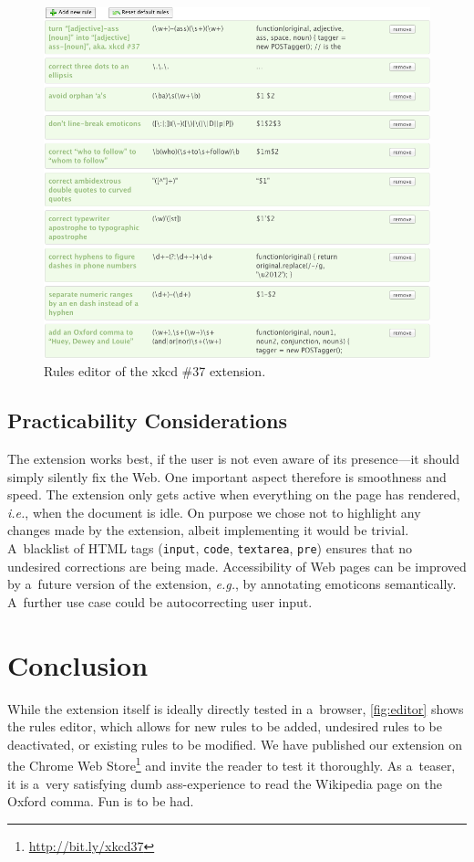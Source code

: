 \documentclass{sig-alternate}
\let\oldemph\emph
\renewcommand{\emph}[1]{\oldemph{\fontsize{9}{9}\selectfont #1}}
\newcommand{\inlinelistingsize}{\fontsize{8pt}{11pt}}
\let\oldurl\url
\renewcommand{\url}[1]{\inlinelistingsize\oldurl{#1}}
\begin{document}
\begin{figure}[h!]
\vspace{+10pt}
\begin{center}
   \includegraphics[width=1\linewidth]{./editor.png}
\end{center}
   \caption{Rules editor of the xkcd \#37 extension.}
\label{fig:editor}
\end{figure}

\subsection{Practicability Considerations}
The extension works best, if the user is not even aware of its
presence---it should simply silently fix the Web.
One important aspect therefore is smoothness and speed.
The extension only gets active when everything on the page has rendered, \emph{i.e.},
when the document is idle.
On purpose we chose not to highlight any changes made by the extension,
albeit implementing it would be trivial.
A~blacklist of HTML tags (\texttt{input}, \texttt{code}, \texttt{textarea}, \texttt{pre})
ensures that no undesired corrections are being made.
Accessibility of Web pages can be improved by a~future version of the extension, \emph{e.g.},
by annotating emoticons semantically.
A~further use case could be autocorrecting user input.

\section{Conclusion}
While the extension itself is ideally directly tested in a~browser, \autoref{fig:editor} shows the rules editor,
which allows for new rules to be added, undesired rules to be deactivated, or existing rules to be modified.
We have published our extension on the Chrome Web Store\footnote{\url{http://bit.ly/xkcd37}} and invite the reader to test it thoroughly.
As a~teaser, it is a~very satisfying dumb ass-experience to read the Wikipedia page on the Oxford comma.
Fun is to be had.
\end{document}
